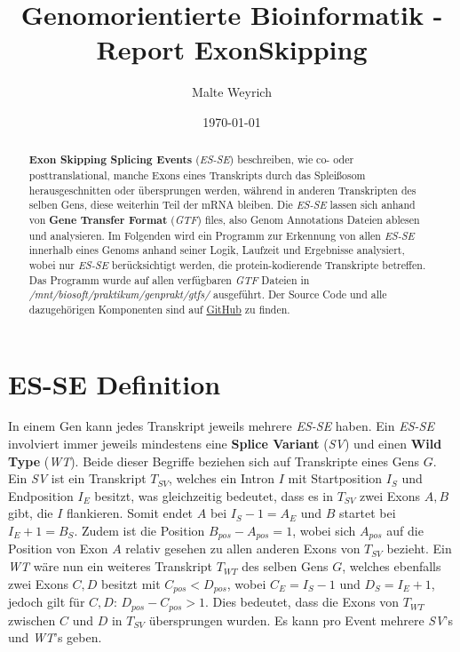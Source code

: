 \documentclass[12pt]{article}
\title{Genomorientierte Bioinformatik - Report ExonSkipping}
\author{
  Malte Weyrich
}
\date{\today}
\begin{document}
\maketitle
\begin{abstract}
	\textbf{Exon Skipping Splicing Events} (\textit{ES-SE}) beschreiben, wie co- oder posttranslational,
	manche Exons eines Transkripts durch das Splei\ss osom herausgeschnitten oder übersprungen werden, während
	in anderen Transkripten des selben Gens, diese weiterhin Teil der mRNA bleiben.
	Die \textit{ES-SE} lassen sich anhand von \textbf{Gene Transfer Format} (\textit{GTF}) files,
	also Genom Annotations Dateien ablesen und analysieren.
	Im Folgenden wird ein Programm zur Erkennung von allen \textit{ES-SE} innerhalb eines Genoms
	anhand seiner Logik, Laufzeit und Ergebnisse analysiert, wobei nur \textit{ES-SE} berücksichtigt werden,
	die protein-kodierende Transkripte betreffen. Das Programm wurde auf allen verfügbaren
	\textit{GTF} Dateien in \textit{/mnt/biosoft/praktikum/genprakt/gtfs/} ausgeführt.
    Der Source Code und alle dazugehörigen Komponenten sind auf \href{https://github.com/mweyrich28/exonSkipping}{GitHub} zu finden.
\end{abstract}

\newpage
\tableofcontents
\newpage



\section{ES-SE Definition}\label{sec:problem}
In einem Gen kann jedes Transkript jeweils mehrere \textit{ES-SE} haben.
Ein \textit{ES-SE} involviert immer jeweils mindestens eine \textbf{Splice Variant} (\textit{SV}) und einen
\textbf{Wild Type} (\textit{WT}). Beide dieser Begriffe beziehen sich auf Transkripte eines Gens $G$.
Ein \textit{SV} ist ein Transkript $T_{SV}$, welches ein Intron $I$ mit Startposition $I_{S}$ und Endposition
$I_{E}$ besitzt, was gleichzeitig bedeutet, dass es in $T_{SV}$ zwei Exons $A, B$ gibt, die $I$ flankieren. Somit endet $A$ bei $I_{S} - 1 = A_{E}$ und $B$ startet bei $I_{E} + 1 = B_{S}$.
Zudem ist die Position $B_{pos} - A_{pos} = 1$, wobei sich $A_{pos}$ auf die Position von Exon $A$ relativ gesehen
zu allen anderen Exons von $T_{SV}$ bezieht.
Ein \textit{WT} wäre nun ein weiteres Transkript $T_{WT}$ des selben Gens $G$, welches ebenfalls
zwei Exons $C, D$ besitzt mit $C_{pos} < D_{pos}$, wobei $C_{E} = I_{S} - 1$ und $D_{S} = I_{E} + 1$,
jedoch gilt für $C, D$: $D_{pos} - C_{pos} > 1$.
Dies bedeutet, dass die Exons von $T_{WT}$ zwischen $C$ und $D$ in $T_{SV}$ übersprungen wurden.
Es kann pro Event mehrere \textit{SV}'s und \textit{WT}'s geben.
\end{document}
